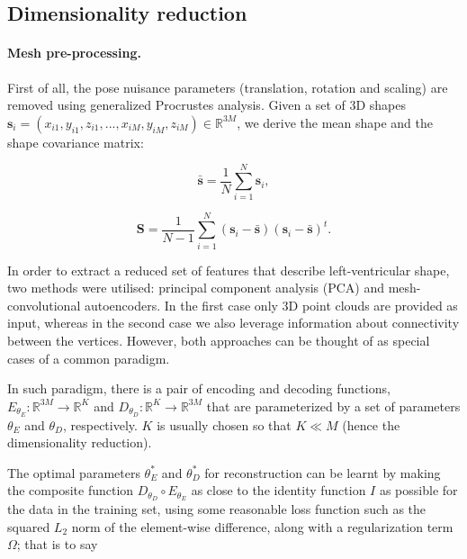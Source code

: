 \documentclass[twocolumn]{llncs}
\begin{document}
\subsection{Dimensionality reduction}

\paragraph{Mesh pre-processing.} First of all, the pose nuisance parameters (translation, rotation and scaling) are removed using generalized Procrustes analysis. 
Given a set of 3D shapes %
$\textbf{s}_i=(x_{i1}, y_{i1}, z_{i1}, ..., x_{iM}, y_{iM}, z_{iM})\in \mathbb{R}^{3M}$,
we derive the mean shape and the shape covariance matrix:

\begin{equation}
\bar{\textbf{s}}=\frac{1}{N}\sum_{i=1}^{N}{\textbf{s}}_i,
\end{equation}

\begin{equation}
\textbf{S}=\frac{1}{N-1}\sum_{i=1}^{N}({\textbf{s}}_i-\bar{\textbf{s}})({\textbf{s}}_i-\bar{\textbf{s}})^t.
\end{equation}

In order to extract a reduced set of features that describe left-ventricular shape, two methods were utilised: principal component analysis (PCA) and mesh-convolutional autoencoders. In the first case only 3D point clouds are provided as input, whereas in the second case we also leverage information about connectivity between the vertices. However, both approaches can be thought of as special cases of a common paradigm.

In such paradigm, there is a pair of encoding and decoding functions, $E_{\theta_E}:\mathbb{R}^{3M}\rightarrow\mathbb{R}^{K}$ and $D_{\theta_D}:\mathbb{R}^{K}\rightarrow\mathbb{R}^{3M}$ that are parameterized by a set of parameters $\theta_E$ and $\theta_D$, respectively. $K$ is usually chosen so that $K\ll M$ (hence the dimensionality reduction). 

The optimal parameters $\theta_E^*$ and $\theta_D^*$ for reconstruction can be learnt by making the composite function $D_{\theta_D} \circ E_{\theta_E}$ as close to the identity function $I$ as possible for the data in the training set, using some reasonable loss function such as the squared $L_2$ norm of the element-wise difference, along with a regularization term $\Omega$; that is to say
\end{document}

